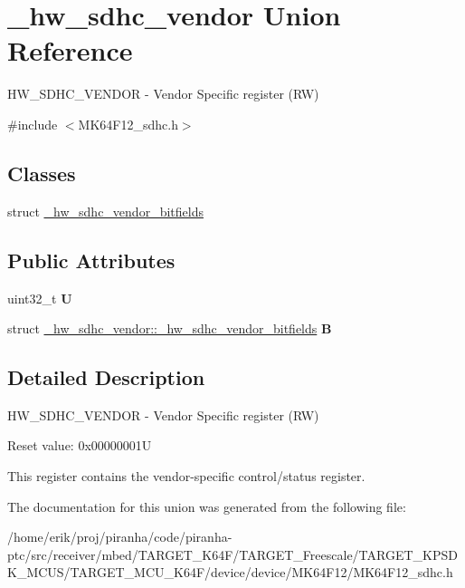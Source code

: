 \hypertarget{union__hw__sdhc__vendor}{}\section{\+\_\+hw\+\_\+sdhc\+\_\+vendor Union Reference}
\label{union__hw__sdhc__vendor}


H\+W\+\_\+\+S\+D\+H\+C\+\_\+\+V\+E\+N\+D\+OR -\/ Vendor Specific register (RW)  




{\ttfamily \#include $<$M\+K64\+F12\+\_\+sdhc.\+h$>$}

\subsection*{Classes}
\begin{DoxyCompactItemize}
\item 
struct \hyperlink{struct__hw__sdhc__vendor_1_1__hw__sdhc__vendor__bitfields}{\+\_\+hw\+\_\+sdhc\+\_\+vendor\+\_\+bitfields}
\end{DoxyCompactItemize}
\subsection*{Public Attributes}
\begin{DoxyCompactItemize}
\item 
uint32\+\_\+t {\bfseries U}\hypertarget{union__hw__sdhc__vendor_a5b211985808e0980b02075507e88cddb}{}\label{union__hw__sdhc__vendor_a5b211985808e0980b02075507e88cddb}

\item 
struct \hyperlink{struct__hw__sdhc__vendor_1_1__hw__sdhc__vendor__bitfields}{\+\_\+hw\+\_\+sdhc\+\_\+vendor\+::\+\_\+hw\+\_\+sdhc\+\_\+vendor\+\_\+bitfields} {\bfseries B}\hypertarget{union__hw__sdhc__vendor_a0d7626d7c540f9b000a7b27deb85c1d9}{}\label{union__hw__sdhc__vendor_a0d7626d7c540f9b000a7b27deb85c1d9}

\end{DoxyCompactItemize}


\subsection{Detailed Description}
H\+W\+\_\+\+S\+D\+H\+C\+\_\+\+V\+E\+N\+D\+OR -\/ Vendor Specific register (RW) 

Reset value\+: 0x00000001U

This register contains the vendor-\/specific control/status register. 

The documentation for this union was generated from the following file\+:\begin{DoxyCompactItemize}
\item 
/home/erik/proj/piranha/code/piranha-\/ptc/src/receiver/mbed/\+T\+A\+R\+G\+E\+T\+\_\+\+K64\+F/\+T\+A\+R\+G\+E\+T\+\_\+\+Freescale/\+T\+A\+R\+G\+E\+T\+\_\+\+K\+P\+S\+D\+K\+\_\+\+M\+C\+U\+S/\+T\+A\+R\+G\+E\+T\+\_\+\+M\+C\+U\+\_\+\+K64\+F/device/device/\+M\+K64\+F12/M\+K64\+F12\+\_\+sdhc.\+h\end{DoxyCompactItemize}
